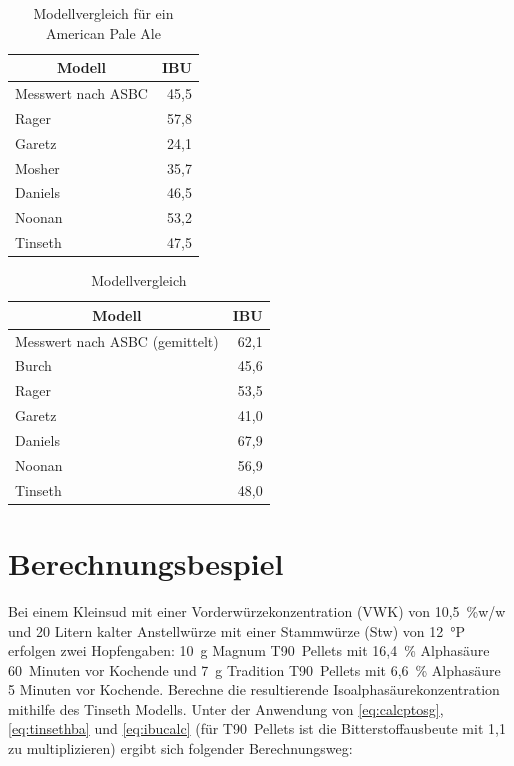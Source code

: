 \documentclass[a4paper,parskip=half]{scrartcl}
\begin{document}
\begin{table}[h]
\centering
\begin{tabular}{lr}
\toprule
\multicolumn{1}{c}{\textbf{Modell}} & \multicolumn{1}{c}{\textbf{IBU}} \\
\midrule
Messwert nach ASBC & 45,5 \\
Rager             & 57,8 \\
Garetz            & 24,1 \\
Mosher            & 35,7 \\
Daniels           & 46,5 \\
Noonan            & 53,2 \\
Tinseth           & 47,5 \\
\bottomrule
\end{tabular}
\caption{Modellvergleich für ein American Pale Ale \parencite{Hall1997}}
\label{table:exphall}
\end{table}

\begin{table}[h]
\centering
\begin{tabular}{lr}
\toprule
\multicolumn{1}{c}{\textbf{Modell}} & \multicolumn{1}{c}{\textbf{IBU}} \\
\midrule
Messwert nach ASBC (gemittelt) & 62,1 \\
Burch             & 45,6 \\
Rager             & 53,5 \\
Garetz            & 41,0 \\
Daniels           & 67,9 \\
Noonan            & 56,9 \\
Tinseth           & 48,0 \\
\bottomrule
\end{tabular}
\caption{Modellvergleich \parencite{Bonham2001}}
\label{table:expbonham}
\end{table}

\section*{Berechnungsbespiel}

Bei einem Kleinsud mit einer Vorderwürzekonzentration (VWK) von 10,5~\%w/w und 20 Litern kalter Anstellwürze  mit einer Stammwürze (Stw) von 12~°P erfolgen zwei Hopfengaben: 10~g Magnum T90~Pellets mit 16,4~\% Alphasäure 60~Minuten vor Kochende und 7~g Tradition T90~Pellets mit 6,6~\% Alphasäure 5 Minuten vor Kochende. Berechne die resultierende Isoalphasäurekonzentration mithilfe des Tinseth Modells. Unter der Anwendung von \autoref{eq:calcptosg}, \autoref{eq:tinsethba} und \autoref{eq:ibucalc} (für T90~Pellets ist die Bitterstoffausbeute mit 1,1 zu multiplizieren) ergibt sich folgender Berechnungsweg:
\end{document}
